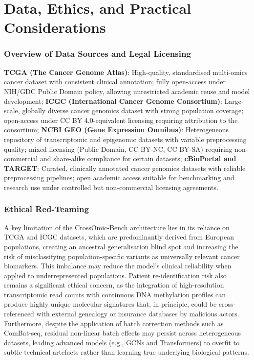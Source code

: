 \documentclass[conference]{IEEEtran}
\begin{document}
\section{Data, Ethics, and Practical Considerations}
\subsubsection{Overview of Data Sources and Legal Licensing}
\textbf{TCGA (The Cancer Genome Atlas)}: High-quality, standardised multi-omics cancer dataset with consistent clinical annotation; fully open-access under NIH/GDC Public Domain policy, allowing unrestricted academic reuse and model development; \textbf{ICGC (International Cancer Genome Consortium)}: Large-scale, globally diverse cancer genomics dataset with strong population coverage; open-access under CC BY 4.0-equivalent licensing requiring attribution to the consortium; \textbf{NCBI GEO (Gene Expression Omnibus)}: Heterogeneous repository of transcriptomic and epigenomic datasets with variable preprocessing quality; mixed licensing (Public Domain, CC BY-NC, CC BY-SA) requiring non-commercial and share-alike compliance for certain datasets; \textbf{cBioPortal and TARGET}: Curated, clinically annotated cancer genomics datasets with reliable preprocessing pipelines; open academic access suitable for benchmarking and research use under controlled but non-commercial licensing agreements.
\subsubsection{Ethical Red-Teaming} A key limitation of the CrossOmic-Bench architecture lies in its reliance on TCGA and ICGC datasets, which are predominantly derived from European populations, creating an ancestral generalisation blind spot and increasing the risk of misclassifying population-specific variants as universally relevant cancer biomarkers. This imbalance may reduce the model’s clinical reliability when applied to underrepresented populations. Patient re-identification risk also remains a significant ethical concern, as the integration of high-resolution transcriptomic read counts with continuous DNA methylation profiles can produce highly unique molecular signatures that, in principle, could be cross-referenced with external genealogy or insurance databases by malicious actors. Furthermore, despite the application of batch correction methods such as ComBat-seq, residual non-linear batch effects may persist across heterogeneous datasets, leading advanced models (e.g., GCNs and Transformers) to overfit to subtle technical artefacts rather than learning true underlying biological patterns.
\end{document}
